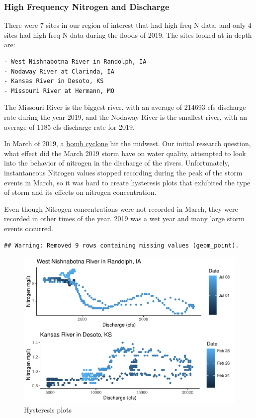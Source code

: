 \documentclass[12pt,]{article}
\begin{document}
\hypertarget{high-frequency-nitrogen-and-discharge}{%
\subsubsection{High Frequency Nitrogen and
Discharge}\label{high-frequency-nitrogen-and-discharge}}

There were 7 sites in our region of interest that had high freq N data,
and only 4 sites had high freq N data during the floods of 2019. The
sites looked at in depth are:

\begin{verbatim}
- West Nishnabotna River in Randolph, IA
- Nodaway River at Clarinda, IA
- Kansas River in Desoto, KS
- Missouri River at Hermann, MO
\end{verbatim}

The Missouri River is the biggest river, with an average of 214693 cfs
discharge rate during the year 2019, and the Nodaway River is the
smallest river, with an average of 1185 cfs discharge rate for 2019.

In March of 2019, a
\href{https://www.kansascity.com/news/state/missouri/article228237519.html}{bomb
cyclone} hit the midwest. Our initial research question, what effect did
the March 2019 storm have on water quality, attempted to look into the
behavior of nitrogen in the discharge of the rivers. Unfortunately,
instantaneous Nitrogen values stopped recording during the peak of the
storm events in March, so it was hard to create hysteresis plots that
exhibited the type of storm and its effects on nitrogen concentration.

Even though Nitrogen concentrations were not recorded in March, they
were recorded in other times of the year. 2019 was a wet year and many
large storm events occurred.

\begin{verbatim}
## Warning: Removed 9 rows containing missing values (geom_point).
\end{verbatim}

\begin{figure}
\centering
\includegraphics{Project_Template_files/figure-latex/desotos-1.pdf}
\caption{\label{fig:desotos} Hysteresis plots}
\end{figure}
\end{document}
